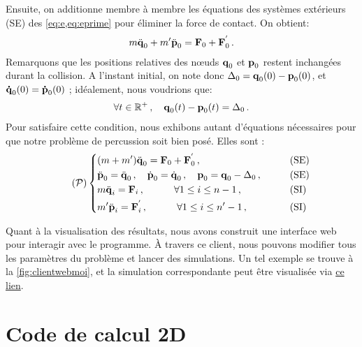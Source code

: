 \noindent Ensuite, on additionne membre à membre les équations des systèmes extérieurs (SE) des \cref{eq:e,eq:eprime} pour éliminer la force de contact. On obtient:
\begin{align}
m \ddot{\bm{\mathrm{q}}}_0 + m' \ddot{\bm{\mathrm{p}}}_0 = \bm{\mathrm{F}}_0 + \bm{\mathrm{F}}^{'}_0 \,.
\end{align}
Remarquons que les positions relatives des n\oe{}uds $\bm{\mathrm{q}}_0$ et $\bm{\mathrm{p}}_0$ restent inchangées durant la collision. A l'instant initial, on note donc $\Delta_0 = \bm{\mathrm{q}}_0(0) - \bm{\mathrm{p}}_0(0)$, et $\bm{\mathrm{\dot q}}_0(0) = \bm{\mathrm{\dot p}}_0(0)$ ; idéalement, nous voudrions que:
\begin{align}
\forall t \in \mathbb{R}^+ \,, \quad \bm{\mathrm{q}}_0(t) - \bm{\mathrm{p}}_0(t) = \Delta_0\,.
\end{align}
Pour satisfaire cette condition, nous exhibons autant d'équations nécessaires pour que notre problème de percussion soit bien posé. Elles sont :
\begin{align} \tag{$\mathcal{P}$} \label{eq:problemeP}
\begin{dcases}
    (m+m') \ddot{\bvec{q}}_0  = \bvec{F}_0 + \bvec{F}^{'}_0  \,, &\qquad \text{(SE)} \\
    \ddot{\bvec{p}}_0 = \ddot{\bvec{q}}_0 \,, \quad \dot{\bvec{p}}_0 = \dot{\bvec{q}}_0 \,, \quad \bvec{p}_0 = \bvec{q}_0 - \Delta_0 \,, &\qquad \text{(SE)} \\
    m \ddot{\bvec{q}}_i = \bvec{F}_i   \,, \quad \quad \quad \forall 1 \leq i \leq n-1 \,, &\qquad \text{(SI)} \\
    m' \ddot{\bvec{p}}_i = \bvec{F}^{'}_i   \,, \quad \quad \quad \forall 1 \leq i \leq n'-1 \,, &\qquad \text{(SI)}
\end{dcases}
\end{align}

Quant à la visualisation des résultats, nous avons construit une interface web pour interagir avec le programme. À travers ce client, nous pouvons modifier tous les paramètres du problème et lancer des simulations. Un tel exemple se trouve à la \cref{fig:clientwebmoi}, et la simulation correspondante peut être visualisée via \href{https://seafile.unistra.fr/f/8ab67b150b724e9baf6b/}{ce lien}. 





\section{Code de calcul 2D}



